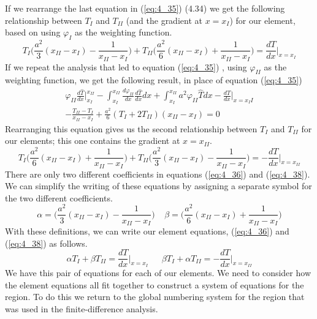 \documentclass[12pt]{report}
\newcommand{\spn}[1]{\\[#1cm]}
\newcommand{\refn}[1]{(\ref{#1})}
\newcommand{\refx}[1]{\refn{eq:#1}}
\newcommand{\dsp}{\displaystyle}
\begin{document}
	If we rearrange the last equation in \refx{4_35} (4.34) we get the following relationship between $T_I$ and $T_{II}$ (and the gradient at $x = x_I$) for our element, based on using $\varphi_{I}$ as the weighting function.
	\begin{equation}
		T_I\Biggl(\frac{a^2}{3}(x_{II}-x_I)-\frac{1}{x_{II} - x_I}\Biggr) + T_{II}\Biggl(\frac{a^2}{6}(x_{II}-x_I)+\frac{1}{x_{II} - x_I}\Biggr) = \frac{dT}{dx}\biggl|_{x=x_I}\label{eq:4_36}
	\end{equation}
	If we repeat the analysis that led to equation \refx{4_35} , using $\varphi_{II}$ as the weighting function, we get the following result, in place of equation \refx{4_35}
	\begin{equation}
		\begin{array}{l}
			\dsp \varphi_{II}\frac{d\hat{T}}{dx}\Biggl|_{x_I}^{x_{II}} - \int_{x_{I}}^{x_{II}}\frac{d\varphi_{II}}{dx}\frac{d\hat{T}}{dx}dx + \int_{x_{I}}^{x_{II}}a^2\varphi_{II}\hat{T} dx - \frac{dT}{dx}\Biggl|_{x=x_II}\spn{0.8}
			\dsp- \frac{T_{II} - T_I}{x_{II} - x_I} + \frac{a^2}{6}(T_I + 2T_{II})(x_{II}-x_I) = 0 
		\end{array}\label{eq:4_37}
	\end{equation}
	Rearranging this equation gives us the second relationship between $T_I$ and $T_{II}$ for our elements; this one contains the gradient at $x = x_{II}$.
	\begin{equation}
		T_I\Biggl(\frac{a^2}{6}(x_{II}-x_I)+\frac{1}{x_{II} - x_I}\Biggr) + T_{II}\Biggl(\frac{a^2}{3}(x_{II}-x_I)-\frac{1}{x_{II} - x_I}\Biggr) =- \frac{dT}{dx}\biggl|_{x=x_{II}}\label{eq:4_38}
	\end{equation}
	There are only two different coefficients in equations \refx{4_36} and \refx{4_38}. We can simplify the writing of these equations by assigning a separate symbol for the two different coefficients.
	\begin{equation}
		\alpha = \Biggl(\frac{a^2}{3}(x_{II}-x_I)-\frac{1}{x_{II} - x_I}\Biggr)~~~~~ \beta = \Biggl(\frac{a^2}{6}(x_{II}-x_I)+\frac{1}{x_{II} - x_I}\Biggr) \label{eq:4_39}
	\end{equation}
	With these definitions, we can write our element equations, \refx{4_36} and \refx{4_38} as follows.
	\begin{equation}
		\alpha T_I + \beta T_{II} = \frac{dT}{dx}\Biggl|_{x=x_I} ~~~~~~~\beta T_I + \alpha T_{II} =- \frac{dT}{dx}\Biggl|_{x=x_{II}} \label{eq:4_40}
	\end{equation}
	We have this pair of equations for each of our elements. We need to consider how the element equations all fit together to construct a system of equations for the region. To do this we return to the global numbering system for the region that was used in the finite-difference analysis.\\
	
\end{document}
